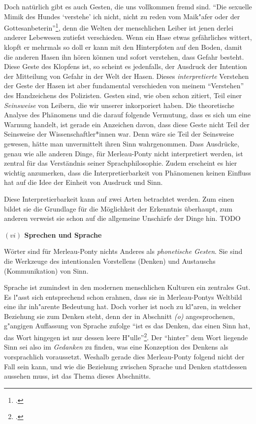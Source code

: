 \documentclass[a4paper, 12pt]{article}
\begin{document}
\begin{onehalfspace}
Doch natürlich gibt es auch Gesten, die uns vollkommen fremd sind. "`Die sexuelle Mimik des Hundes `verstehe' ich nicht, nicht zu reden vom Maik"afer oder der Gottesanbeterin"'\footnote{\Cite[Siehe][S. 219]{merleau1966phanomenologie}.}, denn die Welten der menschlichen Leiber ist jenen derlei anderer Lebewesen zutiefst verschieden. Wenn ein Hase etwas gefährliches wittert, klopft er mehrmals so doll er kann mit den Hinterpfoten auf den Boden, damit die anderen Hasen ihn hören können und sofort verstehen, dass Gefahr besteht. Diese Geste des Klopfens ist, so scheint es jedenfalls, der Ausdruck der Intention der Mitteilung von Gefahr in der Welt der Hasen. Dieses \emph{interpretierte} Verstehen der Geste der Hasen ist aber fundamental verschieden von meinem "`Verstehen"' des Handzeichens des Polizisten. Gesten sind, wie oben schon zitiert, Teil einer \emph{Seinsweise} von Leibern, die wir unserer inkorporiert haben. Die theoretische Analyse des Phänomens und die darauf folgende Vermutung, dass es sich um eine Warnung handelt, ist gerade ein Anzeichen davon, dass diese Geste nicht Teil der Seinsweise der Wissenschaftler*innen war. Denn wäre sie Teil der Seinsweise gewesen, hätte man unvermittelt ihren Sinn wahrgenommen. Dass Ausdrücke, genau wie alle anderen Dinge, für Merleau-Ponty nicht interpretiert werden, ist zentral für das Verständnis seiner Sprachphilosophie. Zudem erscheint es hier wichtig anzumerken, dass die Interpretierbarkeit von Phänomenen keinen Einfluss hat auf die Idee der Einheit von Ausdruck und Sinn.

Diese Interpretierbarkeit kann auf zwei Arten betrachtet werden. Zum einen bildet sie die Grundlage für die Möglichkeit der Erkenntnis überhaupt, zum anderen verweist sie schon auf die allgemeine Unschärfe der Dinge hin. 	TODO

\vspace{5mm}

\noindent\textbf{$(vi)$ Sprechen und Sprache}

\noindent Wörter sind für Merleau-Ponty nichts Anderes als \emph{phonetische Gesten}. Sie sind die Werkzeuge des intentionalen Vorstellens (Denken) und Austauschs (Kommunikation) von Sinn. 

Sprache ist zumindest in den modernen menschlichen Kulturen ein zentrales Gut. Es l"asst sich entsprechend schon erahnen, dass sie in Merleau-Pontys Weltbild eine ihr inh"arente Bedeutung hat. Doch vorher ist noch zu kl"aren, in welcher Beziehung sie zum Denken steht, denn der in Abschnitt \emph{(o)} angesprochenen, g"angigen Auffassung von Sprache zufolge "`ist es das Denken, das einen Sinn hat, das Wort hingegen ist nur dessen leere H"ulle"'\footnote{\Cite[S. 210]{merleau1966phanomenologie}.}. Der "`hinter"' dem Wort liegende Sinn sei also im \emph{Gedanken} zu finden, was eine Konzeption des Denkens als vorsprachlich voraussetzt. Weshalb gerade dies Merleau-Ponty folgend nicht der Fall sein kann, und wie die Beziehung zwischen Sprache und Denken stattdessen aussehen muss, ist das Thema dieses Abschnitts. 


\end{onehalfspace}
\end{document}

